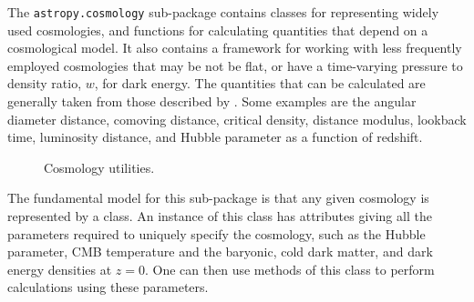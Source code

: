 \documentclass[traditabstract]{aa}
\begin{document}
\label{sec:cosmology}


The \texttt{astropy.cosmology} sub-package contains classes for
representing widely used cosmologies, and functions for calculating
quantities that depend on a cosmological model. It also contains a
framework for working with less frequently employed cosmologies that
may be not be flat, or have a time-varying pressure to density ratio,
$w$, for dark energy. The quantities that can be calculated are
generally taken from those described by \citet{Hogg99}. Some examples
are the angular diameter distance, comoving distance, critical
density, distance modulus, lookback time, luminosity distance, and
Hubble parameter as a function of redshift.

\begin{figure}
\center
\caption{Cosmology utilities.\label{code:cosmology}}
\vspace{0.1in}
\end{figure}

The fundamental model for this sub-package is that any given cosmology
is represented by a class. An instance of this class has attributes
giving all the parameters required to uniquely specify the cosmology,
such as the Hubble parameter, CMB temperature and the baryonic, cold
dark matter, and dark energy densities at $z=0$. One can then use
methods of this class to perform calculations using these parameters.
\end{document}
